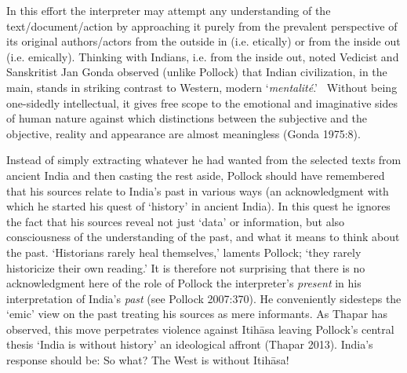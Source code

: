 In this effort the interpreter may attempt any understanding of the text/document/action by approaching it purely from the prevalent perspective of its original authors/actors from the outside in (i.e. etically) or from the inside out (i.e. emically). Thinking with Indians, i.e. from the inside out, noted Vedicist and Sanskritist Jan Gonda observed (unlike Pollock) that Indian civilization, in the main, stands in striking contrast to Western, modern ‘\textit{mentalité}.'  Without being one-sidedly intellectual, it gives free scope to the emotional and imaginative sides of human nature against which distinctions between the subjective and the objective, reality and appearance are almost meaningless (Gonda 1975:8).

Instead of simply extracting whatever he had wanted from the selected texts from ancient India and then casting the rest aside, Pollock should have remembered that his sources relate to India’s past in various ways (an acknowledgment with which he started his quest of ‘history’ in ancient India). In this quest he ignores the fact that his sources reveal not just ‘data’ or information, but also consciousness of the understanding of the past, and what it means to think about the past. ‘Historians rarely heal themselves,’ laments Pollock; ‘they rarely historicize their own reading.’ It is therefore not surprising that there is no acknowledgment here of the role of Pollock the interpreter’s \textit{present} in his interpretation of India’s \textit{past} (see Pollock 2007:370). He conveniently sidesteps the ‘emic’ view on the past treating his sources as mere informants. As Thapar has observed, this move perpetrates violence against Itihāsa leaving Pollock’s central thesis ‘India is without history’ an ideological affront (Thapar 2013). India’s response should be: So what? The West is without Itihāsa! 

